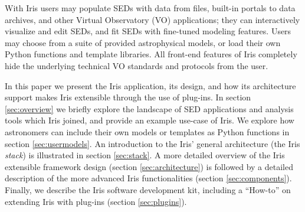 \documentclass[5p]{elsarticle}
\begin{document}
With Iris users may populate SEDs with data from files, built-in portals to data archives, and other Virtual Observatory (VO) applications; they can interactively visualize and edit SEDs, and fit SEDs with fine-tuned modeling features. Users may choose from a suite of provided astrophysical models, or load their own Python functions and template libraries. All front-end features of Iris completely hide the underlying technical VO standards and protocols from the user.




In this paper we present the Iris application, its design, and how its architecture support makes Iris extensible through the use of plug-ins. In section \ref{sec:overview} we briefly explore the landscape of SED applications and analysis tools which Iris joined, and provide an example use-case of Iris. We explore how astronomers can include their own models or templates as Python functions in section \ref{sec:usermodels}. An introduction to the Iris' general architecture (the Iris \emph{stack}) is illustrated in section \ref{sec:stack}. A more detailed overview of the Iris extensible framework design (section \ref{sec:architecture}) is followed by a detailed description of the more advanced Iris functionalities (section \ref{sec:components}). Finally, we describe the Iris software development kit, including a ``How-to'' on extending Iris with plug-ins (section \ref{sec:plugins}).
\end{document}
